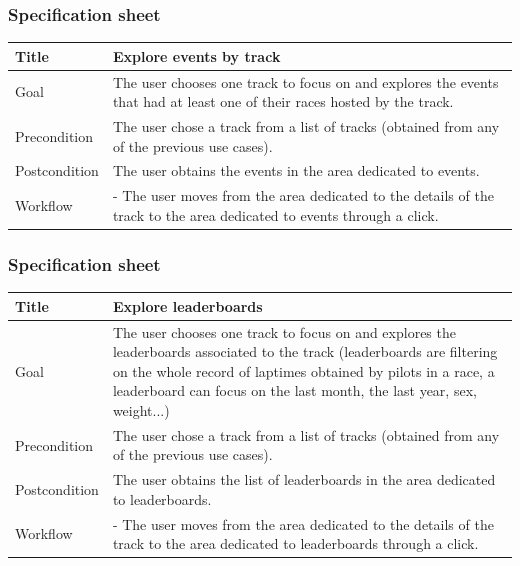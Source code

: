 \documentclass{beamer}
\begin{document}
\begin{frame}
    \frametitle{Specification sheet}
    \begin{table}
        \tiny
        \begin{tabular}{|p{2cm}|p{6cm}|}
        \hline
        Title & \textbf{Explore events by track} \\
        \hline
        Goal & The user chooses one track to focus on and explores the events that had at least one
        of their races hosted by the track. \\
        \hline
        Precondition & The user chose a track from a list of tracks (obtained from any of the previous use cases).\\
        \hline
        Postcondition & The user obtains the events in the area dedicated to events. \\
        \hline
        Workflow &
        - The user moves from the area dedicated to the details of the track to the
        area dedicated to events through a click. \\
        \hline
        \end{tabular}
\end{table}
\end{frame}

\begin{frame}
    \frametitle{Specification sheet}
    \begin{table}
        \tiny
        \begin{tabular}{|p{2cm}|p{6cm}|}
        \hline
        Title & \textbf{Explore leaderboards} \\
        \hline
        Goal & The user chooses one track to focus on and explores the leaderboards associated
        to the track (leaderboards are filtering on the whole record of laptimes obtained by pilots in a race,
        a leaderboard can focus on the last month, the last year, sex, weight...) \\
        \hline
        Precondition & The user chose a track from a list of tracks (obtained from any of the previous use cases).\\
        \hline
        Postcondition & The user obtains the list of leaderboards in the area dedicated to leaderboards. \\
        \hline
        Workflow &
        - The user moves from the area dedicated to the details of the track to the
        area dedicated to leaderboards through a click. \\
        \hline
        \end{tabular}
\end{table}
\end{frame}
\end{document}
